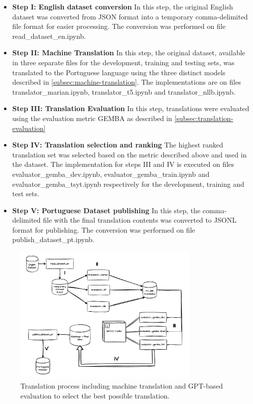 \documentclass{article}
\begin{document}
\begin{itemize}
    \item \textbf{Step I: English dataset conversion} In this step, the original
    English dataset was converted from JSON format into a temporary 
    comma-delimited file format for easier processing. The conversion was
    performed on file read\_dataset\_en.ipynb.
    \item \textbf{Step II: Machine Translation} In this step, the original
    dataset, available in three separate files for the development, training and
    testing sets, was translated to the Portuguese language using the three
    distinct models described in \ref{subsec:machine-translation}. The
    implementations are on files translator\_marian.ipynb, translator\_t5.ipynb
    and translator\_nllb.ipynb.
    \item \textbf{Step III: Translation Evaluation} In this step, translations were evaluated
    using the evaluation metric GEMBA as described in \ref{subsec:translation-evaluation}
    \item \textbf{Step IV: Translation selection and ranking} The highest ranked translation set
    was selected based on the metric described above and used in the dataset.
    The implementation for steps III and IV is executed on files
    evaluator\_gemba\_dev.ipynb, evaluator\_gemba\_train.ipynb and
    evaluator\_gemba\_tsyt.ipynb respectively for the development, training and
    test sets.
    \item \textbf{Step V: Portuguese Dataset publishing}  In this step, the
    comma-delimited file with the final translation contents was converted to
    JSONL format for publishing. The conversion was performed on file 
    publish\_dataset\_pt.ipynb.
\end{itemize}
 
\begin{figure}[htbp]
    \centering
    \includegraphics[width=0.8\textwidth]{drawio/translation.drawio.pdf}
    \caption{\label{fig:diagram}Translation process including machine
    translation and GPT-based evaluation to select the best possible
    translation.}
\end{figure}
\end{document}
